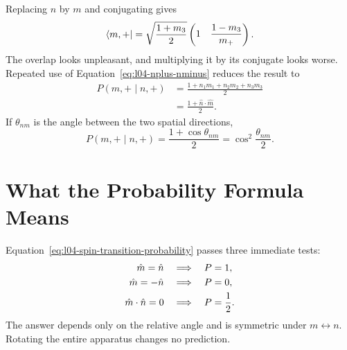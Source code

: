 Replacing \(n\) by \(m\) and conjugating gives
\begin{equation}
  \left\langle m,+\right\rvert
  =
  \sqrt{\frac{1+m_3}{2}}
  \begin{pmatrix}
    1&
    \dfrac{1-m_3}{m_+}
  \end{pmatrix}.
\end{equation}
The overlap looks unpleasant, and multiplying it by its conjugate looks worse. Repeated use of Equation~\eqref{eq:l04-nplus-nminus} reduces the result to
\begin{equation}
  \begin{aligned}
    P(m,+\mid n,+)
    &=\frac{1+n_1m_1+n_2m_2+n_3m_3}{2}\\
    &=\frac{1+\hat n\cdot\hat m}{2}.
  \end{aligned}
  \label{eq:l04-spin-transition-probability}
\end{equation}
If \(\theta_{nm}\) is the angle between the two spatial directions,
\begin{equation}
  P(m,+\mid n,+)
  =
  \frac{1+\cos\theta_{nm}}{2}
  =
  \cos^2\frac{\theta_{nm}}{2}.
  \label{eq:l04-half-angle-probability}
\end{equation}

\begin{classroomqa}
\end{classroomqa}

\section{What the Probability Formula Means}

Equation~\eqref{eq:l04-spin-transition-probability} passes three immediate tests:
\begin{align}
  \hat m=\hat n
  &\quad\Longrightarrow\quad P=1,
  \notag\\
  \hat m=-\hat n
  &\quad\Longrightarrow\quad P=0,
  \notag\\
  \hat m\cdot\hat n=0
  &\quad\Longrightarrow\quad P=\frac12.
\end{align}
The answer depends only on the relative angle and is symmetric under \(m\leftrightarrow n\). Rotating the entire apparatus changes no prediction.

